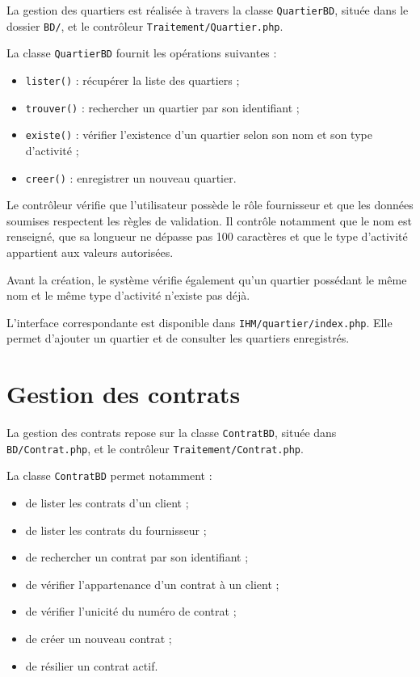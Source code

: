 La gestion des quartiers est réalisée à travers la classe \texttt{QuartierBD}, située dans le dossier \texttt{BD/}, et le contrôleur \texttt{Traitement/Quartier.php}.

La classe \texttt{QuartierBD} fournit les opérations suivantes :
\begin{itemize}
    \item \texttt{lister()} : récupérer la liste des quartiers ;
    \item \texttt{trouver()} : rechercher un quartier par son identifiant ;
    \item \texttt{existe()} : vérifier l'existence d'un quartier selon son nom et son type d'activité ;
    \item \texttt{creer()} : enregistrer un nouveau quartier.
\end{itemize}

Le contrôleur vérifie que l'utilisateur possède le rôle fournisseur et que les données soumises respectent les règles de validation. Il contrôle notamment que le nom est renseigné, que sa longueur ne dépasse pas 100 caractères et que le type d'activité appartient aux valeurs autorisées.

Avant la création, le système vérifie également qu'un quartier possédant le même nom et le même type d'activité n'existe pas déjà.

L'interface correspondante est disponible dans \texttt{IHM/quartier/index.php}. Elle permet d'ajouter un quartier et de consulter les quartiers enregistrés.

\section{Gestion des contrats}

La gestion des contrats repose sur la classe \texttt{ContratBD}, située dans \texttt{BD/Contrat.php}, et le contrôleur \texttt{Traitement/Contrat.php}.

La classe \texttt{ContratBD} permet notamment :
\begin{itemize}
    \item de lister les contrats d'un client ;
    \item de lister les contrats du fournisseur ;
    \item de rechercher un contrat par son identifiant ;
    \item de vérifier l'appartenance d'un contrat à un client ;
    \item de vérifier l'unicité du numéro de contrat ;
    \item de créer un nouveau contrat ;
    \item de résilier un contrat actif.
\end{itemize}

